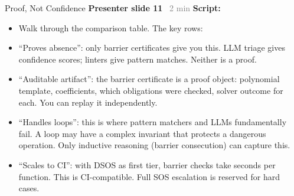 \documentclass[aspectratio=169]{beamer}
\newcommand{\syncline}[2]{\textbf{#1} \hfill \textcolor{gray}{#2}}
\begin{document}

\begin{frame}{Proof, Not Confidence}
\syncline{Presenter slide 11}{~2 min}
\textbf{Script:}
\begin{itemize}
  \item Walk through the comparison table. The key rows:
  \item ``Proves absence'': only barrier certificates give you this. LLM triage gives confidence scores; linters give pattern matches. Neither is a proof.
  \item ``Auditable artifact'': the barrier certificate is a proof object: polynomial template, coefficients, which obligations were checked, solver outcome for each. You can replay it independently.
  \item ``Handles loops'': this is where pattern matchers and LLMs fundamentally fail. A loop may have a complex invariant that protects a dangerous operation. Only inductive reasoning (barrier consecution) can capture this.
  \item ``Scales to CI'': with DSOS as first tier, barrier checks take seconds per function. This is CI-compatible. Full SOS escalation is reserved for hard cases.
\end{itemize}
\end{frame}

\end{document}
